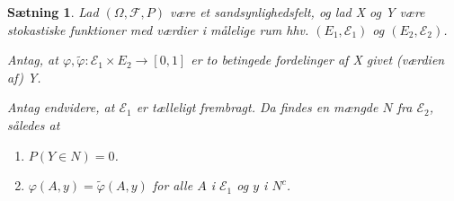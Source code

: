 \documentclass{article}
\newcommand{\1}{\mathbbm{1}}
\theoremstyle{boxed}
\newtheorem{proposition}[theorem]{Sætning}
\begin{document}
\begin{theorem-box}
    \begin{proposition}
        Lad $(\Omega, \mathcal{F}, P)$ være et sandsynlighedsfelt, og lad X og Y være stokastiske funktioner med værdier i målelige rum hhv. $\left(E_1, \mathcal{E}_1\right)$ og $\left(E_2, \mathcal{E}_2\right)$.

Antag, at $\varphi, \tilde{\varphi}: \mathcal{E}_1 \times E_2 \rightarrow[0,1]$ er to betingede fordelinger af X givet (værdien af) Y.

Antag endvidere, at $\mathcal{E}_1$ er tælleligt frembragt.
Da findes en mængde $N$ fra $\mathcal{E}_2$, således at
\begin{enumerate}
    \item[\textnormal{(i)}] $P(Y \in N)=0$.
    \item[\textnormal{(ii)}] $\varphi(A, y)=\tilde{\varphi}(A, y)$ for alle $A$ i $\mathcal{E}_1$ og $y$ i $N^c$.
\end{enumerate}
    \end{proposition}
\end{theorem-box}
\end{document}
